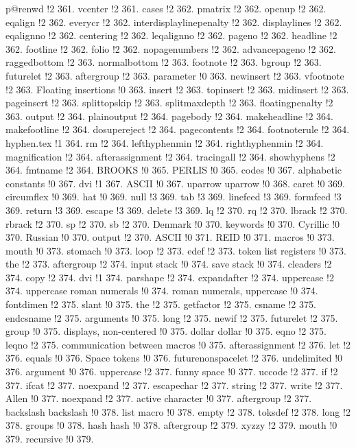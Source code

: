 p@renwd !2 361.
vcenter !2 361.
cases !2 362.
pmatrix !2 362.
openup !2 362.
eqalign !2 362.
everycr !2 362.
interdisplaylinepenalty !2 362.
displaylines !2 362.
eqalignno !2 362.
centering !2 362.
leqalignno !2 362.
pageno !2 362.
headline !2 362.
footline !2 362.
folio !2 362.
nopagenumbers !2 362.
advancepageno !2 362.
raggedbottom !2 363.
normalbottom !2 363.
footnote !2 363.
bgroup !2 363.
futurelet !2 363.
aftergroup !2 363.
parameter !0 363.
newinsert !2 363.
vfootnote !2 363.
Floating insertions !0 363.
insert !2 363.
topinsert !2 363.
midinsert !2 363.
pageinsert !2 363.
splittopskip !2 363.
splitmaxdepth !2 363.
floatingpenalty !2 363.
output !2 364.
plainoutput !2 364.
pagebody !2 364.
makeheadline !2 364.
makefootline !2 364.
dosupereject !2 364.
pagecontents !2 364.
footnoterule !2 364.
hyphen.tex !1 364.
rm !2 364.
lefthyphenmin !2 364.
righthyphenmin !2 364.
magnification !2 364.
afterassignment !2 364.
tracingall !2 364.
showhyphens !2 364.
fmtname !2 364.
BROOKS !0 365.
PERLIS !0 365.
codes !0 367.
alphabetic constants !0 367.
dvi !1 367.
ASCII !0 367.
uparrow uparrow !0 368.
caret !0 369.
circumflex !0 369.
hat !0 369.
null !3 369.
tab !3 369.
linefeed !3 369.
formfeed !3 369.
return !3 369.
escape !3 369.
delete !3 369.
lq !2 370.
rq !2 370.
lbrack !2 370.
rbrack !2 370.
sp !2 370.
sb !2 370.
Denmark !0 370.
keywords !0 370.
Cyrillic !0 370.
Russian !0 370.
output !2 370.
ASCII !0 371.
REID !0 371.
macros !0 373.
mouth !0 373.
stomach !0 373.
loop !2 373.
edef !2 373.
token list registers !0 373.
the !2 373.
aftergroup !2 374.
input stack !0 374.
save stack !0 374.
cleaders !2 374.
copy !2 374.
dvi !1 374.
parshape !2 374.
expandafter !2 374.
uppercase !2 374.
uppercase roman numerals !0 374.
roman numerals, uppercase !0 374.
fontdimen !2 375.
slant !0 375.
the !2 375.
getfactor !2 375.
csname !2 375.
endcsname !2 375.
arguments !0 375.
long !2 375.
newif !2 375.
futurelet !2 375.
group !0 375.
displays, non-centered !0 375.
dollar dollar !0 375.
eqno !2 375.
leqno !2 375.
communication between macros !0 375.
afterassignment !2 376.
let !2 376.
equals !0 376.
Space tokens !0 376.
futurenonspacelet !2 376.
undelimited !0 376.
argument !0 376.
uppercase !2 377.
funny space !0 377.
uccode !2 377.
if !2 377.
ifcat !2 377.
noexpand !2 377.
escapechar !2 377.
string !2 377.
write !2 377.
Allen !0 377.
noexpand !2 377.
active character !0 377.
aftergroup !2 377.
backslash backslash !0 378.
list macro !0 378.
empty !2 378.
toksdef !2 378.
long !2 378.
groups !0 378.
hash hash !0 378.
aftergroup !2 379.
xyzzy !2 379.
mouth !0 379.
recursive !0 379.
